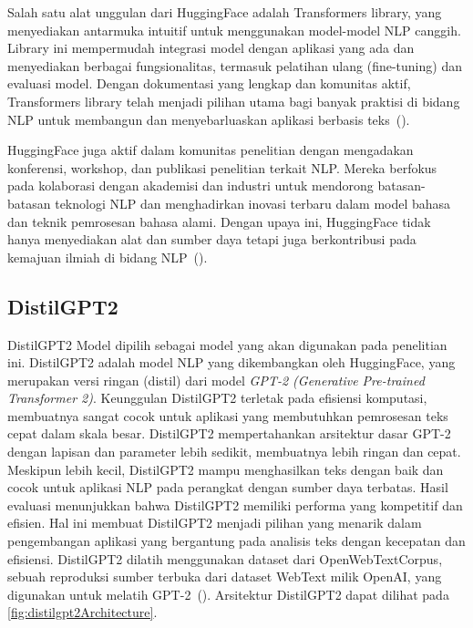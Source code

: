 Salah satu alat unggulan dari HuggingFace adalah Transformers library, yang menyediakan antarmuka intuitif untuk menggunakan model-model NLP canggih. Library ini mempermudah integrasi model dengan aplikasi yang ada dan menyediakan berbagai fungsionalitas, termasuk pelatihan ulang (fine-tuning) dan evaluasi model. Dengan dokumentasi yang lengkap dan komunitas aktif, Transformers library telah menjadi pilihan utama bagi banyak praktisi di bidang NLP untuk membangun dan menyebarluaskan aplikasi berbasis teks~(\cite{wolf2021}).

HuggingFace juga aktif dalam komunitas penelitian dengan mengadakan konferensi, workshop, dan publikasi penelitian terkait NLP. Mereka berfokus pada kolaborasi dengan akademisi dan industri untuk mendorong batasan-batasan teknologi NLP dan menghadirkan inovasi terbaru dalam model bahasa dan teknik pemrosesan bahasa alami. Dengan upaya ini, HuggingFace tidak hanya menyediakan alat dan sumber daya tetapi juga berkontribusi pada kemajuan ilmiah di bidang NLP~(\cite{huggingface}).



\subsection{DistilGPT2}

DistilGPT2 Model dipilih sebagai model yang akan digunakan pada 
penelitian ini. DistilGPT2 adalah model NLP yang dikembangkan oleh 
HuggingFace, yang merupakan versi ringan (distil) dari model 
\emph{GPT-2 (Generative Pre-trained Transformer 2)}. Keunggulan 
DistilGPT2 terletak pada efisiensi komputasi, membuatnya sangat 
cocok untuk aplikasi yang membutuhkan pemrosesan teks cepat dalam 
skala besar. DistilGPT2 mempertahankan arsitektur dasar GPT-2 dengan 
lapisan dan parameter lebih sedikit, membuatnya lebih ringan dan cepat. 
Meskipun lebih kecil, DistilGPT2 mampu menghasilkan teks dengan baik 
dan cocok untuk aplikasi NLP pada perangkat dengan sumber daya 
terbatas. Hasil evaluasi menunjukkan bahwa DistilGPT2 memiliki 
performa yang kompetitif dan efisien. Hal ini membuat DistilGPT2 
menjadi pilihan yang menarik dalam pengembangan aplikasi yang 
bergantung pada analisis teks dengan kecepatan dan efisiensi.
DistilGPT2 dilatih menggunakan dataset dari OpenWebTextCorpus, sebuah reproduksi sumber terbuka dari dataset WebText milik OpenAI, yang digunakan untuk melatih GPT-2~(\cite{sanh2019}).
Arsitektur DistilGPT2 dapat dilihat pada 
\ref{fig:distilgpt2Architecture}.

